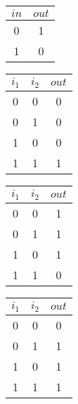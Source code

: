 \documentclass[main.tex]{subfiles}
\begin{document}
  \begin{minipage}[t]{0.166\textwidth}
    \begin{center}
      \begin{tabular}{|c|c|}
        \hline
        $in$ & $out$
        \\ \hline \hline
        0 & 1
        \\ \hline
        1 & 0
        \\ \hline
      \end{tabular}
    \end{center}
  \end{minipage}\hfill
  \begin{minipage}[t]{0.166\textwidth}
    \begin{center}
      \begin{tabular}{|c|c|c|}
        \hline
        $i_1$ & $i_2$ & $out$
        \\ \hline \hline
        0 & 0 & 0
        \\ \hline
        0 & 1 & 0
        \\ \hline
        1 & 0 & 0
        \\ \hline
        1 & 1 & 1
        \\ \hline
      \end{tabular}
    \end{center}
  \end{minipage}\hfill
  \begin{minipage}[t]{0.166\textwidth}
    \begin{center}
      \begin{tabular}{|c|c|c|}
        \hline
        $i_1$ & $i_2$ & $out$
        \\ \hline \hline
        0 & 0 & 1
        \\ \hline
        0 & 1 & 1
        \\ \hline
        1 & 0 & 1
        \\ \hline
        1 & 1 & 0
        \\ \hline
      \end{tabular}
    \end{center}
  \end{minipage}\hfill
  \begin{minipage}[t]{0.166\textwidth}
    \begin{center}
      \begin{tabular}{|c|c|c|}
        \hline
        $i_1$ & $i_2$ & $out$
        \\ \hline \hline
        0 & 0 & 0
        \\ \hline
        0 & 1 & 1
        \\ \hline
        1 & 0 & 1
        \\ \hline
        1 & 1 & 1
        \\ \hline
      \end{tabular}
    \end{center}
  \end{minipage}\hfill
\end{document}
